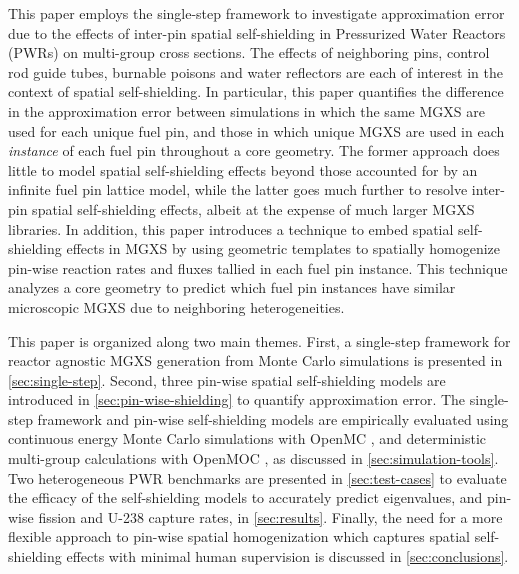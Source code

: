 This paper employs the single-step framework to investigate approximation error due to the effects of inter-pin spatial self-shielding in Pressurized Water Reactors (PWRs) on multi-group cross sections. The effects of neighboring pins, control rod guide tubes, burnable poisons and water reflectors are each of interest in the context of spatial self-shielding. In particular, this paper quantifies the difference in the approximation error between simulations in which the same MGXS are used for each unique fuel pin, and those in which unique MGXS are used in each \textit{instance} of each fuel pin throughout a core geometry. The former approach does little to model spatial self-shielding effects beyond those accounted for by an infinite fuel pin lattice model, while the latter goes much further to resolve inter-pin spatial self-shielding effects, albeit at the expense of much larger MGXS libraries. In addition, this paper introduces a technique to embed spatial self-shielding effects in MGXS by using geometric templates to spatially homogenize pin-wise reaction rates and fluxes tallied in each fuel pin instance. This technique analyzes a core geometry to predict which fuel pin instances have similar microscopic MGXS due to neighboring heterogeneities.

This paper is organized along two main themes. First, a single-step framework for reactor agnostic MGXS generation from Monte Carlo simulations is presented in \autoref{sec:single-step}. Second, three pin-wise spatial self-shielding models are introduced in \autoref{sec:pin-wise-shielding} to quantify approximation error. The single-step framework and pin-wise self-shielding models are empirically evaluated using continuous energy Monte Carlo simulations with OpenMC \citep{romano2013openmc}, and deterministic multi-group calculations with OpenMOC \citep{boyd2014openmoc}, as discussed in \autoref{sec:simulation-tools}. Two heterogeneous PWR benchmarks are presented in \autoref{sec:test-cases} to evaluate the efficacy of the self-shielding models to accurately predict eigenvalues, and pin-wise fission and U-238 capture rates, in \autoref{sec:results}. Finally, the need for a more flexible approach to pin-wise spatial homogenization which captures spatial self-shielding effects with minimal human supervision is discussed in \autoref{sec:conclusions}.

